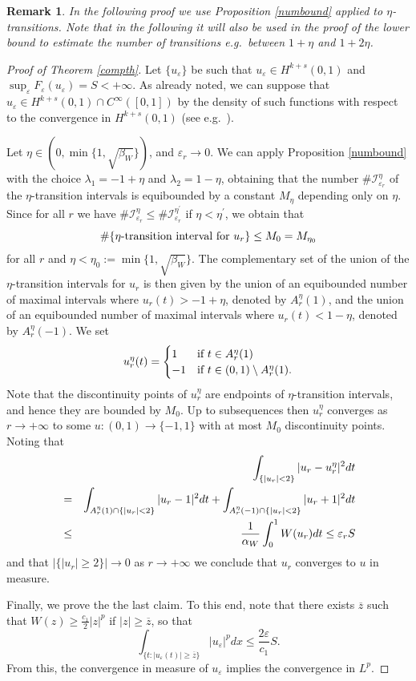 \documentclass{article}
\newtheorem{remark}[lemma]{Remark}
\newcommand{\e}{\varepsilon}
\begin{document}
\begin{remark}\rm In the following proof we use Proposition \ref{numbound} applied to $\eta$-transitions. Note that in the following it will also be used in the proof of the lower bound to estimate the number of transitions e.g.~between $1+\eta$ and $1+2\eta$.
\end{remark}

\begin{proof}[Proof of Theorem {\rm\ref{compth}}] 
Let $\{u_\e\}$ be such that $u_\e\in H^{k+s}(0,1)$ and 
$\sup_\e F_\e(u_\e)=S<+\infty$. As already noted, we can suppose that $u_\e\in H^{k+s}(0,1)\cap C^\infty([0,1])$ by the density of such functions with respect to the convergence in $H^{k+s}(0,1)$ (see e.g.~\cite[Theorem 1.64]{leofrac}). 


Let $\eta\in(0,\min\{1,\sqrt{\beta_W}\})$, and $\e_r\to 0$. 
We can apply Proposition \ref{numbound}  with the choice $\lambda_1=-1+\eta$ and $\lambda_2=1-\eta$, obtaining that the number $\#\mathcal I_{\e_r}^{\eta}$ of the $\eta$-transition intervals is equibounded by a constant $M_\eta$ depending only on $\eta$. Since  for all $r$  we have $\#\mathcal I_{\e_r}^{\eta}\leq \#\mathcal I_{\e_r}^{\eta^\prime}$ if $\eta<\eta^\prime$,  
we obtain that 
$$\# \{\eta\hbox{\rm-transition interval for } u_r\}\leq M_0=M_{\eta_0}$$
for all $r$ and $\eta<\eta_0:=\min\{1,\sqrt{\beta_W}\}$. 
The complementary set of the union of the $\eta$-transition intervals for $u_r$ is then given by the union of an equibounded number of maximal intervals where $u_r(t)>-1+\eta$, denoted by $A^\eta_r(1)$, and the union of an equibounded number of maximal intervals where $u_r(t)<1-\eta$, denoted by $A^\eta_r(-1)$. 
We set 
$$u_{r}^\eta(t)=\begin{cases} 
1 & \hbox{\rm if } t\in A_r^\eta(1)\\
-1 & \hbox{\rm if } t\in (0,1)\setminus A_r^\eta(1). 
\end{cases}$$
Note that the discontinuity points of $u_r^\eta$ are endpoints of $\eta$-transition intervals, and hence they are bounded by $M_0$. Up to subsequences then $u_r^\eta$ converges as $r\to +\infty$ to some $u\colon(0,1)\to \{-1,1\}$ with at most $M_0$ discontinuity points. Noting that
\begin{eqnarray*}
&&\hskip-1.5cm\int_{\{|u_r|<2\}}|u_r-u_r^\eta|^2dt\\
&=& \int_{A_r^\eta(1)\cap\{ |u_r|<2\}}|u_r-1|^2dt+
\int_{A_r^\eta(-1)\cap \{|u_r|<2\}}|u_r+1|^2dt\\
&\le& \frac1{\alpha_W}\int_0^1 W(u_r)dt\le \e_r S
\end{eqnarray*}
and that $|\{|u_r|\ge 2\}|\to 0$ as $r\to+\infty$ we conclude that $u_r$ converges to $u$ in measure.

\smallskip
Finally, we prove the the last claim. To this end, note that there exists $\overline z$ such that $W(z)\ge \frac{c_1}2 |z|^p$ if $|z|\ge \overline z$, so that 
$$
\int_{\{t: |u_\e(t)|\ge \overline z\}}|u_\e|^pdx\le \frac{2\e}{c_1} S.
$$
From this, the convergence in measure of $u_\e$ implies the convergence in $L^p$.
\end{proof} 
\end{document}
